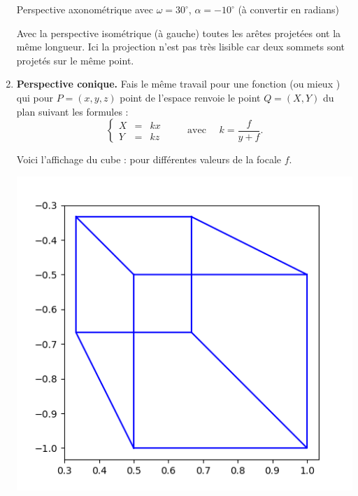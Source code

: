 \documentclass[11pt,class=report,crop=false]{standalone}
\begin{document}
\begin{activite}[Perspective]
\begin{enumerate}
\begin{center}
\begin{minipage}{0.45\textwidth}
\begin{center}
		Perspective axonométrique avec $\omega=30^\circ$, $\alpha=-10^\circ$ (à convertir en radians)
	\end{center}
	\end{minipage}
	\end{center}

	Avec la perspective isométrique (à gauche) toutes les arêtes projetées ont la même longueur. Ici la projection n'est pas très lisible car deux sommets sont projetés sur le même point.
  
  
   \item \textbf{Perspective conique.} 
   Fais le même travail pour une fonction 
   (ou mieux  ) qui pour $P = (x,y,z)$ point de l'espace renvoie le point 
   $Q = (X,Y)$ du plan suivant les formules :
   $$\left\{
	\begin{array}{rcl}
	X &=& kx \\
	Y &=& kz
	\end{array}
	\right.  \qquad \text{ avec } \quad k = \frac{f}{y+f}.$$ 
	
	Voici l'affichage du cube :
	pour différentes valeurs de la focale $f$.
	\begin{center}
	\begin{minipage}{0.22\textwidth}
	\begin{center}
		\includegraphics[scale=\myscale,scale=0.22]{ecran-perspective-6-1}
			

\end{center}
\end{minipage}
\end{center}
\end{enumerate}
\end{activite}
\end{document}
